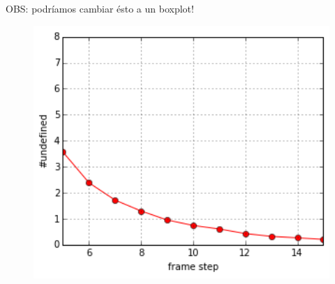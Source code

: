 OBS: podríamos cambiar ésto a un boxplot!

\begin{figure}
\centering
\includegraphics[width=15cm]{images/window_selection.png}
\end{figure}


